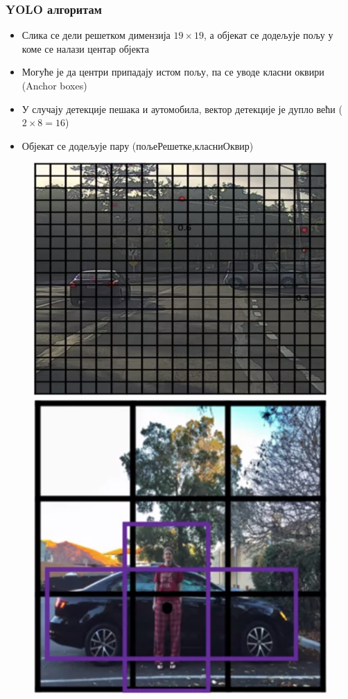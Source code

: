 \begin{frame}
\frametitle{YOLO алгоритам}
\begin{itemize}
 \item Слика се дели \alert{решетком} димензија $19 \times 19$, а
 објекат се \alert{додељује пољу} у коме се налази \alert{центар објекта}
 \item Могуће је да центри
 припадају \alert{истом пољу}, па се уводе \alert{класни оквири}
 (\alert{Anchor boxes})
 \item У случају детекције пешака и аутомобила,
 \alert{вектор} детекције је \alert{дупло већи} ($2 \times 8 = 16$)
 \item Објекат се додељује пару \alert{(пољеРешетке,класниОквир)}

\end{itemize}
\begin{figure}[H]
  \centering
      \includegraphics[scale=0.25]{slike/ngNonMax2.png} \qquad
      \includegraphics[scale=0.27]{slike/ngAnchor1.png}
\end{figure}
\end{frame}

